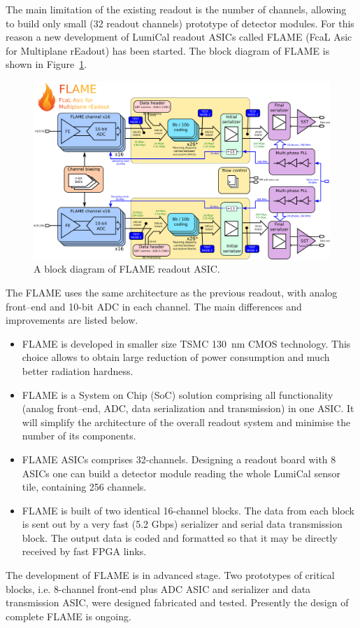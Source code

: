 The main limitation of the existing readout is the number of channels, allowing to build only
small (32 readout channels)  prototype of detector modules. For this reason a new
development of LumiCal readout ASICs called FLAME (FcaL Asic for Multiplane rEadout)
has been started. The block diagram of FLAME is shown in Figure~\ref{fig:FLAME}. 
\begin{figure}[hbp]
\begin{center}
    \includegraphics[width=0.9\columnwidth]{Calorimeter/FCAL/figs/FLAME}
  \end{center}
          \caption{A block diagram of FLAME readout ASIC.}
    \label{fig:FLAME}
\end{figure}
The FLAME uses the same architecture as the previous readout, with analog front--end and 10-bit ADC in each channel.
The main differences and improvements are listed below. 
\begin{itemize}
\item{FLAME is developed in smaller size TSMC 130~nm CMOS technology.
 This choice allows to obtain large reduction of power consumption and much better radiation hardness}.
\item{FLAME is a System on Chip (SoC) solution comprising all functionality
  (analog front--end, ADC, data serialization and transmission) in one ASIC.
  It will simplify the architecture of the overall readout system and minimise the number of its components.}
\item{FLAME ASICs comprises 32-channels. Designing a readout board with 8 ASICs one can build a detector module
  reading the whole LumiCal sensor tile, containing 256 channels. }
\item{FLAME is built of two identical 16-channel blocks. The data from each block is sent out
  by a very fast (5.2 {Gbps}) serializer and serial data transmission block. The output data is coded and formatted so that it may be directly received by fast FPGA links.}
\end{itemize}
The development of FLAME is in advanced stage. Two prototypes of critical blocks, i.e. 8-channel front-end plus ADC
ASIC and serializer and data transmission ASIC, were designed fabricated and tested. Presently the design of complete FLAME
is ongoing.

